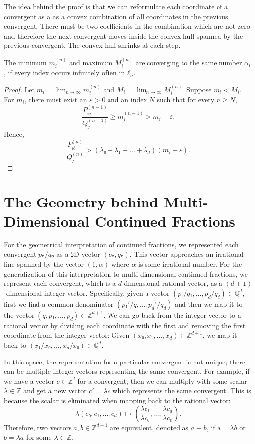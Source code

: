 The idea behind the proof is that we can reformulate each coordinate of a
convergent as a as a convex combination of all coordinates in the previous
convergent.
There must be two coefficients in the combination which are not zero
and therefore the next convergent moves inside the convex hull spanned by the previous convergent.
The convex hull shrinks at each step.

\begin{lemma}
  The minimum $m_i^{(n)}$ and maximum $M_i^{(n)}$ are converging to the same
  number $α_i$, if every index occurs infinitely often in $ℓ_n$.
\end{lemma}

\begin{proof}
  Let $m_i = \lim_{n → ∞} m_i^{(n)}$
  and $M_i = \lim_{n → ∞} M_i^{(n)}$.
  Suppose $m_i < M_i$.
  For $m_i$, there must exist an $ε > 0$ and an index $N$ such that for every $n ≥ N$,
  \[
    \frac{P_{ij}^{(n-1)}}{Q_j^{(n-1)}} ≥ m_i^{(n-1)} > m_i - ε.
  \]
  Hence,
  \[
    \frac{P_{iℓ}^{(n)}}{Q_j^{(n)}} > (λ₀ + λ₁ + \dots + λ_d) (m_i - ε).
  \]
\end{proof}

\section{The Geometry behind Multi-Dimensional Continued Fractions}

For the geometrical interpretation of continued fractions,
we represented each convergent $pₙ/qₙ$ as a 2D vector $(pₙ, qₙ)$.
This vector approaches an irrational line spanned by the vector $(1, α)$ where
$α$ is some irrational number.
For the generalization of this interpretation to multi-dimensional continued
fractions, we represent each convergent, which is a $d$-dimensional rational vector,
as a $(d+1)$-dimensional integer vector.
Specifically, given a vector $(p₁/q₁, …, p_d/q_d) ∈ ℚ^d$, first we find a
common denominator $(p₁'/q, …, p_d'/q_d)$ and then we map it to the vector
$(q, p₁, …, p_d) ∈ ℤ^{d+1}$.
We can go back from the integer vector to a rational vector by dividing each
coordinate with the first and removing the first coordinate from the integer
vector:
Given $(x₀, x₁, …, x_d) ∈ ℤ^{d+1}$, we map it back to $(x₁/x₀, …, x_d/x₀) ∈ ℚ^d$.

In this space, the representation for a particular convergent is not unique,
there can be multiple integer vectors representing the same convergent.
For example, if we have a vector $c ∈ ℤ^d$ for a convergent,
then we can multiply with some scalar $λ ∈ ℤ$ and get a new vector $c' = λ c$
which represents the same convergent.
This is because the scalar is eliminated when mapping back to the rational vector:
\[
  λ (c₀, c₁, …, c_d) ↦  \left(\frac{λ c₁}{λ c₀}, …, \frac{λ c_d}{λ c_0} \right).
\]
Therefore, two vectors $a, b ∈ ℤ^{d+1}$ are equivalent, denoted as $a ≡ b$,
if $a = λ b$ or $b = λ a$ for some $λ ∈ ℤ$.

